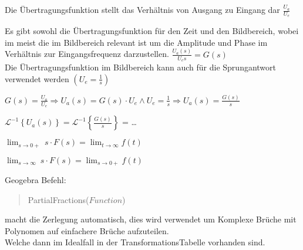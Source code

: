 \documentclass[letterpaper,10pt,english]{jupyterBook}
\begin{document}
\sphinxAtStartPar
Die Übertragungsfunktion stellt das Verhältnis von Ausgang zu Eingang dar \(\frac{U_a}{U_e}\)

\sphinxAtStartPar
Es gibt sowohl die Übertragungsfunktion für den Zeit und den Bildbereich,
wobei im meist die im Bildbereich relevant ist um die Amplitude und Phase im Verhältnis zur Eingangsfrequenz darzustellen.
\(\frac{U_a(s)}{U_e{s}} = G(s)\)\\
Die Übertragungsfunktion im Bildbereich kann auch für die Sprungantwort verwendet werden \(\left(U_e = \frac{1}{s}\right)\)

\begin{DUlineblock}{0em}
\item[] 
\end{DUlineblock}

\begin{DUlineblock}{0em}
\item[] 
\end{DUlineblock}

\sphinxAtStartPar
\(G(s) = \frac{U_a}{U_e} \Rightarrow U_a(s) = G(s) \cdot U_e \wedge U_e = \frac{1}{s} \Rightarrow U_a(s) = \frac{G(s)}{s} \)

\sphinxAtStartPar
\(\mathscr{L}^{-1}\left\{U_a(s)\right\} = \mathscr{L}^{-1}\left\{\frac{G(s)}{s}\right\}\) = …

\begin{DUlineblock}{0em}
\item[] 
\end{DUlineblock}

\sphinxAtStartPar
\(\lim_{s\rightarrow 0+}   ~s \cdot F(s) = \lim_{t\rightarrow\infty}f(t)\)

\sphinxAtStartPar
\(\lim_{s\rightarrow\infty}~s \cdot F(s) = \lim_{s\rightarrow 0+}   f(t)\)

\begin{DUlineblock}{0em}
\item[] 
\end{DUlineblock}

\sphinxAtStartPar
Geogebra Befehl:
\begin{quote}

\sphinxAtStartPar
PartialFractions(\(Function\))
\end{quote}

\sphinxAtStartPar
macht die Zerlegung automatisch,
dies wird verwendet um Komplexe Brüche mit Polynomen auf einfachere Brüche aufzuteilen.\\
Welche dann \sphinxhyphen{} im Idealfall \sphinxhyphen{}  in der Transformations\sphinxhyphen{}Tabelle vorhanden sind.
\end{document}
